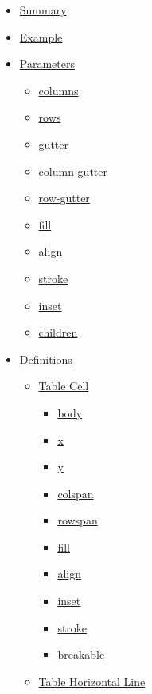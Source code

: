 \begin{itemize}
\tightlist
\item
  \hyperref[summary]{Summary}
\item
  \hyperref[example]{Example}
\item
  \hyperref[parameters]{Parameters}

  \begin{itemize}
  \tightlist
  \item
    \hyperref[parameters-columns]{columns}
  \item
    \hyperref[parameters-rows]{rows}
  \item
    \hyperref[parameters-gutter]{gutter}
  \item
    \hyperref[parameters-column-gutter]{column-gutter}
  \item
    \hyperref[parameters-row-gutter]{row-gutter}
  \item
    \hyperref[parameters-fill]{fill}
  \item
    \hyperref[parameters-align]{align}
  \item
    \hyperref[parameters-stroke]{stroke}
  \item
    \hyperref[parameters-inset]{inset}
  \item
    \hyperref[parameters-children]{children}
  \end{itemize}
\item
  \hyperref[definitions]{Definitions}

  \begin{itemize}
  \tightlist
  \item
    \hyperref[definitions-cell]{Table Cell}

    \begin{itemize}
    \tightlist
    \item
      \hyperref[definitions-cell-body]{body}
    \item
      \hyperref[definitions-cell-x]{x}
    \item
      \hyperref[definitions-cell-y]{y}
    \item
      \hyperref[definitions-cell-colspan]{colspan}
    \item
      \hyperref[definitions-cell-rowspan]{rowspan}
    \item
      \hyperref[definitions-cell-fill]{fill}
    \item
      \hyperref[definitions-cell-align]{align}
    \item
      \hyperref[definitions-cell-inset]{inset}
    \item
      \hyperref[definitions-cell-stroke]{stroke}
    \item
      \hyperref[definitions-cell-breakable]{breakable}
    \end{itemize}
  \item
    \hyperref[definitions-hline]{Table Horizontal Line}


\end{itemize}
\end{itemize}
